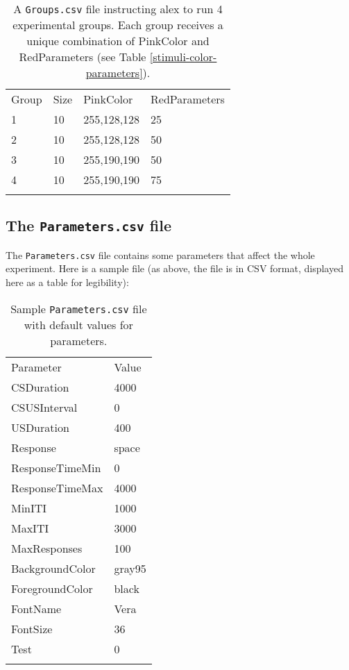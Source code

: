 \documentclass[11pt,]{article}
\renewcommand{\medskip}{}
\begin{document}
\begin{longtable}[c]{@{}llll@{}}
\hline\noalign{\medskip}
Group & Size & PinkColor & RedParameters
\\\noalign{\medskip}
\hline\noalign{\medskip}
1 & 10 & 255,128,128 & 25
\\\noalign{\medskip}
2 & 10 & 255,128,128 & 50
\\\noalign{\medskip}
3 & 10 & 255,190,190 & 50
\\\noalign{\medskip}
4 & 10 & 255,190,190 & 75
\\\noalign{\medskip}
\hline
\noalign{\medskip}
\caption{A \texttt{Groups.csv} file instructing alex to run 4
experimental groups. Each group receives a unique combination of
PinkColor and RedParameters (see Table \ref{stimuli-color-parameters}).
\label{subjects-color-parameters}}
\end{longtable}

\subsection{The \texttt{Parameters.csv} file}

The \texttt{Parameters.csv} file contains some parameters that affect
the whole experiment. Here is a sample file (as above, the file is in
CSV format, displayed here as a table for legibility):

\begin{longtable}[c]{@{}ll@{}}
\hline\noalign{\medskip}
Parameter & Value
\\\noalign{\medskip}
\hline\noalign{\medskip}
CSDuration & 4000
\\\noalign{\medskip}
CSUSInterval & 0
\\\noalign{\medskip}
USDuration & 400
\\\noalign{\medskip}
Response & space
\\\noalign{\medskip}
ResponseTimeMin & 0
\\\noalign{\medskip}
ResponseTimeMax & 4000
\\\noalign{\medskip}
MinITI & 1000
\\\noalign{\medskip}
MaxITI & 3000
\\\noalign{\medskip}
MaxResponses & 100
\\\noalign{\medskip}
BackgroundColor & gray95
\\\noalign{\medskip}
ForegroundColor & black
\\\noalign{\medskip}
FontName & Vera
\\\noalign{\medskip}
FontSize & 36
\\\noalign{\medskip}
Test & 0
\\\noalign{\medskip}
\hline
\noalign{\medskip}
\caption{Sample \texttt{Parameters.csv} file with default values for
parameters.}
\end{longtable}
\end{document}

